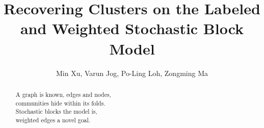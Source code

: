 \documentclass{article}
\begin{document}
\title{Recovering Clusters on the Labeled and Weighted Stochastic Block Model}
\author{Min Xu, Varun Jog, Po-Ling Loh, Zongming Ma}
\maketitle

\begin{abstract}
\centering
\noindent 
A graph is known, edges and nodes, \\
communities hide within its folds. \\
Stochastic blocks the model is, \\
weighted edges a novel goal.
\end{abstract}

\tableofcontents

\newpage

\newpage

\newpage

\newpage

\newpage

\newpage

\newpage

\newpage

\newpage

\newpage




\end{document}

